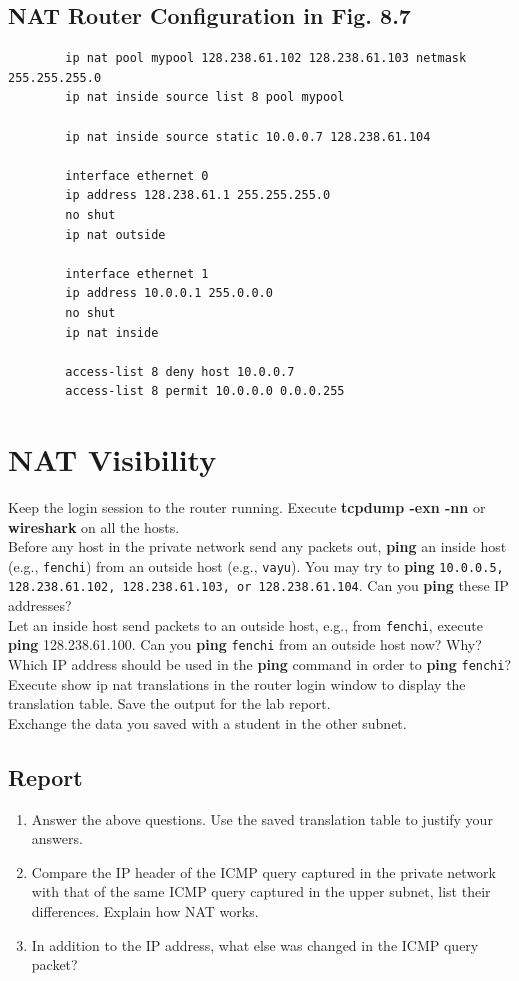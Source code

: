 \documentclass[10pt,a4paper]{article}
\numberwithin{equation}{section}
\numberwithin{figure}{section}
\numberwithin{table}{section}
\begin{document}
    \subsection*{NAT Router Configuration in Fig. 8.7}
    \begin{verbatim}
        ip nat pool mypool 128.238.61.102 128.238.61.103 netmask 255.255.255.0
        ip nat inside source list 8 pool mypool

        ip nat inside source static 10.0.0.7 128.238.61.104

        interface ethernet 0
        ip address 128.238.61.1 255.255.255.0
        no shut
        ip nat outside

        interface ethernet 1
        ip address 10.0.0.1 255.0.0.0
        no shut
        ip nat inside

        access-list 8 deny host 10.0.0.7
        access-list 8 permit 10.0.0.0 0.0.0.255
    \end{verbatim}

\section{NAT Visibility}
    Keep the login session to the router running. Execute \textbf{tcpdump -exn -nn} or \textbf{wireshark} on all the hosts. \\
    Before any host in the private network send any packets out, \textbf{ping} an inside host (e.g., \texttt{fenchi}) from an outside host (e.g., \texttt{vayu}). You may try to \textbf{ping} \texttt{10.0.0.5, 128.238.61.102, 128.238.61.103, or 128.238.61.104}. Can you \textbf{ping} these IP addresses? \\
    Let an inside host send packets to an outside host, e.g., from \texttt{fenchi}, execute \textbf{ping} 128.238.61.100. Can you \textbf{ping} \texttt{fenchi} from an outside host now? Why? Which IP address should be used in the \textbf{ping} command in order to \textbf{ping} \texttt{fenchi}? \\
    Execute show ip nat translations in the router login window to display the translation table. Save the output for the lab report. \\
    Exchange the data you saved with a student in the other subnet.
    \subsection*{Report}
    \begin{enumerate}
        \item Answer the above questions.
        Use the saved translation table to justify your answers.
        \item Compare the IP header of the ICMP query captured in the private network with that of the same ICMP query captured in the upper subnet, list their differences.
        Explain how NAT works.
        \item In addition to the IP address, what else was changed in the ICMP query packet?
    \end{enumerate}
\end{document}
